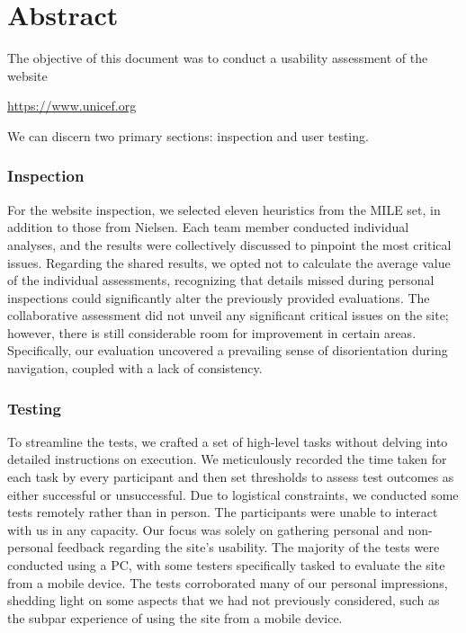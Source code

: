 \section{Abstract}
The objective of this document was to conduct a usability assessment of the website
\begin{center}
    \url{https://www.unicef.org}
\end{center}
We can discern two primary sections: inspection and user testing. 
\subsubsection{Inspection}
For the website inspection, we selected eleven heuristics from the MILE set, in addition to those from Nielsen.
Each team member conducted individual analyses, and the results were collectively discussed to pinpoint the most critical issues.
Regarding the shared results, we opted not to calculate the average value of the individual assessments, recognizing that details missed during personal inspections could significantly alter the previously provided evaluations.
The collaborative assessment did not unveil any significant critical issues on the site; however, there is still considerable room for improvement in certain areas.
Specifically, our evaluation uncovered a prevailing sense of disorientation during navigation, coupled with a lack of consistency.

\subsubsection{Testing}
To streamline the tests, we crafted a set of high-level tasks without delving into detailed instructions on execution. 
We meticulously recorded the time taken for each task by every participant and then set thresholds to assess test outcomes as either successful or unsuccessful. 
Due to logistical constraints, we conducted some tests remotely rather than in person.
The participants were unable to interact with us in any capacity. Our focus was solely on gathering personal and non-personal feedback regarding the site's usability.
The majority of the tests were conducted using a PC, with some testers specifically tasked to evaluate the site from a mobile device.
The tests corroborated many of our personal impressions, shedding light on some aspects that we had not previously considered, such as the subpar experience of using the site from a mobile device.